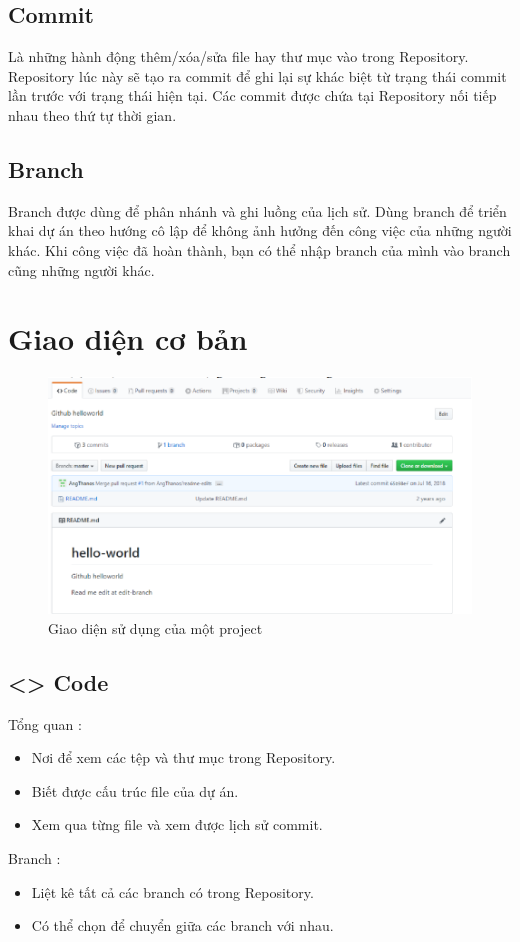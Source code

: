 \documentclass[a4paper]{report}
\begin{document}
\subsection{Commit}
\textrm{Là những hành động thêm/xóa/sửa file hay thư mục vào trong Repository. Repository lúc này sẽ tạo ra commit để ghi lại sự khác biệt từ trạng thái commit lần trước với trạng thái hiện tại.}
\newline
\textrm{Các commit được chứa tại Repository nối tiếp nhau theo thứ tự thời gian.}

\subsection{Branch}
\textrm{Branch được dùng để phân nhánh và ghi luồng của lịch sử.}
\newline
\textrm{Dùng branch để triển khai dự án theo hướng cô lập để không ảnh hưởng đến công việc của những người khác.}
\newline
\textrm{Khi công việc đã hoàn thành, bạn có thể nhập branch của mình vào branch cũng những người khác.}

\section{Giao diện cơ bản}
\begin{figure}[ht]
    \centering
    \includegraphics[scale=0.9]{interface_github.png}
    \caption{Giao diện sử dụng của một project}
\end{figure}

\subsection{<> Code}
\textrm{Tổng quan :}
\begin{itemize}
    \item Nơi để xem các tệp và thư mục trong Repository.
    \item Biết được cấu trúc file của dự án.
    \item Xem qua từng file và xem được lịch sử commit.
\end{itemize}
\textrm{Branch :}
\begin{itemize}
    \item Liệt kê tất cả các branch có trong Repository.
    \item Có thể chọn để chuyển giữa các branch với nhau.
\end{itemize}
\end{document}
